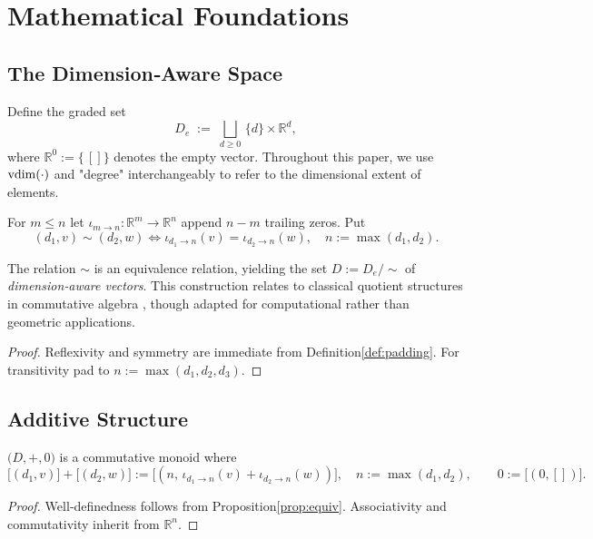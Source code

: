 \section{Mathematical Foundations}
\label{sec:foundations}
\subsection{The Dimension‑Aware Space}
\begin{definition}\label{def:DAspace}
Define the graded set
\[
  D_e\;:=\;\bigsqcup_{d\ge0}\,\{d\}\times\mathbb R^{d},
\]
where \(\mathbb R^{0}:=\{\,[]\}\) denotes the empty vector. Throughout this paper, we use $\operatorname{vdim}(\cdot)$ and "degree" interchangeably to refer to the dimensional extent of elements.
\end{definition}

\begin{definition}\label{def:padding}
For \(m\le n\) let \(\iota_{m\rightarrow n}\colon\mathbb R^{m}\to\mathbb R^{n}\) append \(n-m\) trailing zeros.  Put
\[
  (d_1,v)\sim(d_2,w)
  \iff \iota_{d_1\rightarrow n}(v)=\iota_{d_2\rightarrow n}(w),\quad n:=\max(d_1,d_2).
\]
\end{definition}

\begin{proposition}\label{prop:equiv}
The relation \(\sim\) is an equivalence relation, yielding the set \(D:=D_e/\!\sim\) of \emph{dimension‑aware vectors}. This construction relates to classical quotient structures in commutative algebra \cite{AtiyahMacdonald1969,Eisenbud1995}, though adapted for computational rather than geometric applications.
\end{proposition}
\begin{proof}
Reflexivity and symmetry are immediate from Definition\;\ref{def:padding}.  For transitivity pad to \(n:=\max(d_1,d_2,d_3)\).\end{proof}

\subsection{Additive Structure}
\begin{theorem}\label{thm:add}
\(\bigl(D,+,0\bigr)\) is a commutative monoid where
\[
  \bigl[(d_1,v)\bigr]+\bigl[(d_2,w)\bigr]
  :=\bigl[(n,\,\iota_{d_1\rightarrow n}(v)+\iota_{d_2\rightarrow n}(w))\bigr],
  \quad n:=\max(d_1,d_2),\qquad
  0:=\bigl[(0,[])\bigr].
\]
\end{theorem}
\begin{proof}
Well‑definedness follows from Proposition\;\ref{prop:equiv}. Associativity and commutativity inherit from \(\mathbb R^n\).\end{proof}

